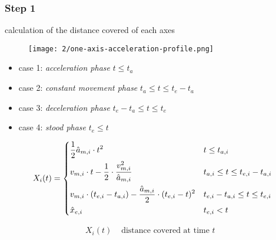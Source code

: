 \documentclass[professionalfonts, 
               xcolor={ usenames, %
                        dvipsnames,%
                        svgnames,%
                        table,%
                        hyperref%
                      }
              ]{beamer}
\begin{document}

\subsubsection{Step 1}
\begin{frame}
calculation of the distance covered of each axes \\

\begin{figure}[h]
  \texttt{[image: 2/one-axis-acceleration-profile.png]}
  \label{fig:ti-movement-cases}
\end{figure}

\begin{itemize}
\item case 1: \emph{acceleration phase} $t \leq t_{a}$
\item case 2: \emph{constant movement phase} $t_{a} \le t \leq t_{e} - t_{a}$
\item case 3: \emph{deceleration phase} $t_{e} - t_{a} \le t \leq t_{e}$
\item case 4: \emph{stood phase} $t_{e} \le t$
\end{itemize}

\end{frame}

\begin{frame}
\begin{equation}
X_{i}(t) = 
\begin{dcases}
\frac{1}{2} \hat{a}_{m,i} \cdot t^2  & t \leq t_{a,i} \\
v_{m,i} \cdot t - \frac{1}{2} \cdot \frac{v_{m,i}^2}{\hat{a}_{m,i}} & t_{a,i} \le t \leq t_{e,i} - t_{a,i} \\
v_{m,i} \cdot (t_{e,i} - t_{a,i}) - \frac{\hat{a}_{m,i}}{2} \cdot (t_{e,i} - t)^2 & t_{e,i} - t_{a,i} \le t \leq t_{e,i}\\
\hat{x}_{e,i} & t_{e,i} < t\\
\end{dcases}
\end{equation}

\begin{align*}
X_{i}(t) & \text{ distance covered at time $t$ } \\
\end{align*}
\end{frame}
\end{document}
